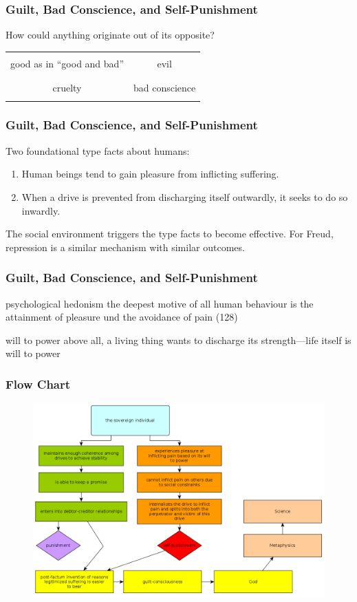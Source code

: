 \documentclass[xcolor=dvipsnames]{beamer}
\begin{document}
\begin{frame}
  \frametitle{Guilt, Bad Conscience, and Self-Punishment}
  How could anything originate out of its opposite?

  \bigskip
  
  \begin{tabular}{|c|c|}\hline
    & \\
    good as in ``good and bad'' & evil \\
    & \\ \hline
    & \\
    cruelty & bad conscience \\
    & \\ \hline
  \end{tabular}
\end{frame}

\begin{frame}
  \frametitle{Guilt, Bad Conscience, and Self-Punishment}
  Two foundational type facts about humans:
  \begin{enumerate}
  \item Human beings tend to gain pleasure from inflicting suffering.
  \item When a drive is prevented from discharging itself outwardly,
    it seeks to do so inwardly.
  \end{enumerate}
  The social environment triggers the type facts to become effective.
  For Freud, repression is a similar mechanism with similar outcomes.
\end{frame}

\begin{frame}
  \frametitle{Guilt, Bad Conscience, and Self-Punishment}
  \begin{block}{psychological hedonism}
    the deepest motive of all human behaviour is the attainment of
    pleasure und the avoidance of pain (128)
  \end{block}
  \begin{block}{will to power}
    above all, a living thing wants to discharge its strength---life
    itself is will to power
  \end{block}
\end{frame}

\begin{frame}
  \frametitle{Flow Chart}
      \begin{figure}[h]
    \includegraphics[scale=1]{./janaway-nietzsche-guilt.png}
  \end{figure}
\end{frame}
\end{document}
